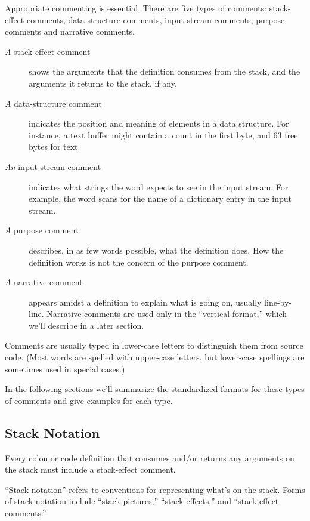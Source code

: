 Appropriate commenting is essential.  There are five types of comments:
stack-effect comments, data-structure comments, input-stream comments,
purpose comments and narrative comments.
\begin{description}
\item[\emph{A} stack-effect comment]%
shows the arguments that the definition consumes from the stack, and
the arguments it returns to the stack, if any.

\item[\emph{A} data-structure comment]%
indicates the position and meaning of elements in a data structure.
For instance, a text buffer might contain a count in the first byte,
and 63 free bytes for text.

\item[\emph{An} input-stream comment]%
indicates what strings the word expects to see in the input stream.
For example, the \Forth{} word  scans for the name of a
dictionary entry in the input stream.

\item[\emph{A} purpose comment]%
describes, in as few words possible, what the definition does.  How
the definition works is not the concern of the purpose comment.

\item[\emph{A} narrative comment]%
appears amidst a definition to explain what is going on, usually
line-by-line.  Narrative comments are used only in the ``vertical
format,'' which we'll describe in a later section.
\end{description}

Comments are usually typed in lower-case letters to distinguish them
from source code.  (Most \Forth{} words are spelled with upper-case
letters, but lower-case spellings are sometimes used in special cases.)

In the following sections we'll summarize the standardized formats
for these types of comments and give examples for each type.

\subsection{Stack Notation}%
\begin{tip}
Every colon or code definition that consumes and/or returns any arguments
on the stack must include a stack-effect comment.
\end{tip}
``Stack notation'' refers to conventions for representing what's on
the stack.  Forms of stack notation include ``stack pictures,''
``stack effects,'' and ``stack-effect comments.''%
%

